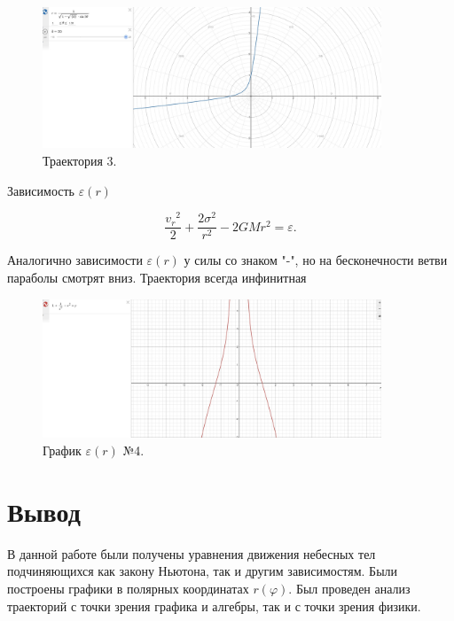 \documentclass[a4paper]{article}
\begin{document}
\begin{figure}[h]
    \centering
    \includegraphics[width=0.9\textwidth]{Graphic5.jpg}
    \caption{Траектория 3.}
\end{figure}

Зависимость $\varepsilon(r)$

\[
\frac{{v_{r}}^2}{2} + \frac{2\sigma^2}{r^2} - 2GMr^2 = \varepsilon.
\]

Аналогично зависимости $\varepsilon(r)$ у силы со знаком "-", но на бесконечности ветви параболы смотрят вниз. Траектория всегда инфинитная
\clearpage
\begin{figure}[h]
    \centering
    \includegraphics[width=0.9\textwidth]{Finit4.jpg}
    \caption{График $\varepsilon(r) $ №4.}
\end{figure}


\section*{Вывод}
В данной работе были получены уравнения движения небесных тел подчиняющихся как закону Ньютона, так и другим зависимостям. Были построены графики в полярных координатах $r(\varphi)$. Был проведен анализ траекторий с точки зрения графика и алгебры, так и с точки зрения физики.
\end{document}
